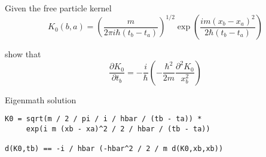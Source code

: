 \documentclass[12pt]{article}
\begin{document}
\noindent
Given the free particle kernel
\begin{equation*}
K_0(b,a)=\left(\frac{m}{2\pi i\hbar(t_b-t_a)}\right)^{1/2}
\exp\left(\frac{im(x_b-x_a)^2}{2\hbar(t_b-t_a)}\right)
\end{equation*}

\noindent
show that
\begin{equation*}
\frac{\partial K_0}{\partial t_b}
=-\frac{i}{\hbar}
\left(
-\frac{\hbar^2}{2m}
\frac{\partial^2 K_0}{x_b^2}
\right)
\end{equation*}

\bigskip
\noindent
Eigenmath solution
\begin{verbatim}
K0 = sqrt(m / 2 / pi / i / hbar / (tb - ta)) *
     exp(i m (xb - xa)^2 / 2 / hbar / (tb - ta))

d(K0,tb) == -i / hbar (-hbar^2 / 2 / m d(K0,xb,xb))
\end{verbatim}
\end{document}

